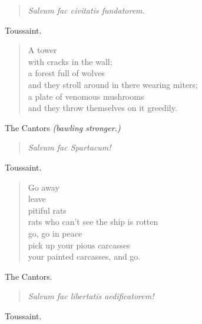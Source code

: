 \documentclass[letterpaper,article,12pt,oneside,notitlepage]{memoir}
\begin{document}
\begin{verse}
\textit{Salvum fac civitatis fundatorem.} \\
\end{verse}

\begin{center}Toussaint.\end{center}

\begin{verse}
A tower \\
with cracks in the wall; \\
a forest full of wolves \\
and they stroll around in there wearing miters; \\
a plate of venomous mushrooms \\
and they throw themselves on it greedily. \\
\end{verse}

\begin{center}The Cantors \textit{(bawling stronger.)}\end{center}

\begin{verse}
\textit{Salvum fac Spartacum!} \\
\end{verse}

\begin{center}Toussaint.\end{center}

\begin{verse}
Go away \\
leave \\
pitiful rats \\
rats who can't see the ship is rotten \\
go, go in peace \\
pick up your pious carcasses \\
your painted carcasses, and go. \\
\end{verse}

\begin{center}The Cantors.\end{center}

\begin{verse}
\textit{Salvum fac libertatis aedificatorem!} \\
\end{verse}

\begin{center}Toussaint.\end{center}
\end{document}
